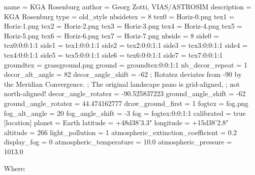\begin{configfile}
[landscape]
name = KGA Rosenburg
author = Georg Zotti, VIAS/ASTROSIM
description = KGA Rosenburg
type = old_style
nbsidetex = 8
tex0 = Horiz-0.png
tex1 = Horiz-1.png
tex2 = Horiz-2.png
tex3 = Horiz-3.png
tex4 = Horiz-4.png
tex5 = Horiz-5.png
tex6 = Horiz-6.png
tex7 = Horiz-7.png
nbside = 8
side0 = tex0:0:0:1:1
side1 = tex1:0:0:1:1
side2 = tex2:0:0:1:1
side3 = tex3:0:0:1:1
side4 = tex4:0:0:1:1
side5 = tex5:0:0:1:1
side6 = tex6:0:0:1:1
side7 = tex7:0:0:1:1
groundtex = grassground.png
ground = groundtex:0:0:1:1
nb_decor_repeat = 1
decor_alt_angle =  82
decor_angle_shift = -62
; Rotatez deviates from -90 by the Meridian Convergence.
; The original landscape pano is grid-aligned, 
; not north-aligned!
decor_angle_rotatez =  -90.525837223
ground_angle_shift = -62
ground_angle_rotatez =  44.474162777
draw_ground_first = 1
fogtex = fog.png
fog_alt_angle = 20
fog_angle_shift = -3
fog = fogtex:0:0:1:1
calibrated = true
[location]
planet = Earth
latitude = +48d38'3.3"
longitude = +15d38'2.8"
altitude = 266
light_pollution = 1
atmospheric_extinction_coefficient = 0.2
display_fog = 0
atmospheric_temperature = 10.0
atmospheric_pressure = 1013.0
\end{configfile}
%
Where:
